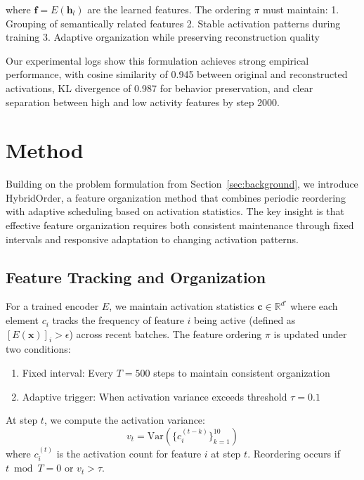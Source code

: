 \documentclass{article} %
\begin{document}
where $\mathbf{f} = E(\mathbf{h}_l)$ are the learned features. The ordering $\pi$ must maintain:
1. Grouping of semantically related features
2. Stable activation patterns during training
3. Adaptive organization while preserving reconstruction quality

Our experimental logs show this formulation achieves strong empirical performance, with cosine similarity of 0.945 between original and reconstructed activations, KL divergence of 0.987 for behavior preservation, and clear separation between high and low activity features by step 2000.

\section{Method}
\label{sec:method}

Building on the problem formulation from Section~\ref{sec:background}, we introduce HybridOrder, a feature organization method that combines periodic reordering with adaptive scheduling based on activation statistics. The key insight is that effective feature organization requires both consistent maintenance through fixed intervals and responsive adaptation to changing activation patterns.

\subsection{Feature Tracking and Organization}
For a trained encoder $E$, we maintain activation statistics $\mathbf{c} \in \mathbb{R}^{d'}$ where each element $c_i$ tracks the frequency of feature $i$ being active (defined as $[E(\mathbf{x})]_i > \epsilon$) across recent batches. The feature ordering $\pi$ is updated under two conditions:

\begin{enumerate}
    \item Fixed interval: Every $T=500$ steps to maintain consistent organization
    \item Adaptive trigger: When activation variance exceeds threshold $\tau=0.1$
\end{enumerate}

At step $t$, we compute the activation variance:
\begin{equation}
    v_t = \text{Var}(\{c_i^{(t-k)}\}_{k=1}^{10})
\end{equation}
where $c_i^{(t)}$ is the activation count for feature $i$ at step $t$. Reordering occurs if $t \bmod T = 0$ or $v_t > \tau$.
\end{document}
